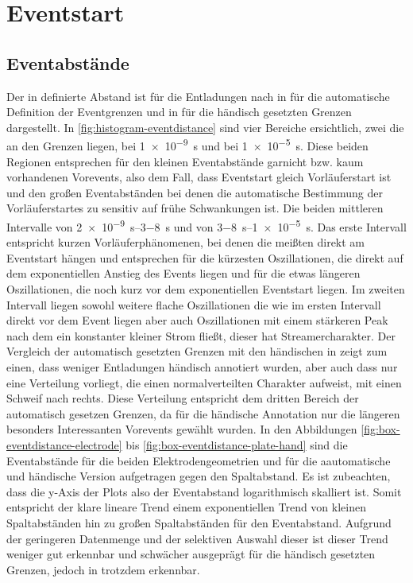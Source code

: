 \chapter{Eventstart}
\label{chap:eventstart}

\section{Eventabstände}

Der in  definierte Abstand ist für die Entladungen nach  in  für die automatische Definition der Eventgrenzen und in  für die händisch gesetzten Grenzen dargestellt. In \ref{fig:histogram-eventdistance} sind vier Bereiche ersichtlich, zwei die an den Grenzen liegen, bei \SI{1e-9}{\second} und bei \SI{1e-5}{\second}. Diese beiden Regionen entsprechen für den kleinen Eventabstände garnicht bzw. kaum vorhandenen Vorevents, also dem Fall, dass Eventstart gleich Vorläuferstart ist und den großen Eventabständen bei denen die automatische Bestimmung der Vorläuferstartes zu sensitiv auf frühe Schwankungen ist. Die beiden mittleren Intervalle von \SIrange{2e-9}{3-8}{\second} und von \SIrange{3-8}{1e-5}{\second}. Das erste Intervall entspricht kurzen Vorläuferphänomenen, bei denen die meißten direkt am Eventstart hängen und entsprechen für die kürzesten Oszillationen, die direkt auf dem exponentiellen Anstieg des Events liegen und für die etwas längeren Oszillationen, die noch kurz vor dem exponentiellen Eventstart liegen. Im zweiten Intervall liegen sowohl weitere flache Oszillationen die wie im ersten Intervall direkt vor dem Event liegen aber auch Oszillationen mit einem stärkeren Peak nach dem ein konstanter kleiner Strom fließt, dieser hat Streamercharakter. Der Vergleich der automatisch gesetzten Grenzen mit den händischen in  zeigt zum einen, dass weniger Entladungen händisch annotiert wurden, aber auch dass nur eine Verteilung vorliegt, die einen normalverteilten Charakter aufweist, mit einen Schweif nach rechts. Diese Verteilung entspricht dem dritten Bereich der automatisch gesetzen Grenzen, da für die händische Annotation nur die längeren besonders Interessanten Vorevents gewählt wurden. In den Abbildungen \ref{fig:box-eventdistance-electrode} bis \ref{fig:box-eventdistance-plate-hand} sind die Eventabstände für die beiden Elektrodengeometrien und für die aautomatische und händische Version aufgetragen gegen den Spaltabstand. Es ist zubeachten, dass die y-Axis der Plots also der Eventabstand logarithmisch skalliert ist. Somit entspricht der klare lineare Trend einem exponentiellen Trend von kleinen Spaltabständen hin zu großen Spaltabständen für den Eventabstand. Aufgrund der geringeren Datenmenge und der selektiven Auswahl dieser ist dieser Trend weniger gut erkennbar und schwächer ausgeprägt für die händisch gesetzten Grenzen, jedoch in  trotzdem erkennbar.







